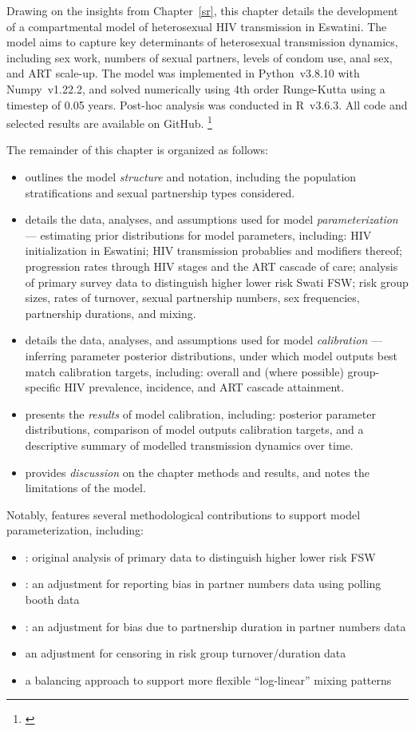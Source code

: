 Drawing on the insights from Chapter~\ref{sr},
this chapter details the development of
a compartmental model of heterosexual HIV transmission in Eswatini.
The model aims to capture key determinants of heterosexual transmission dynamics, including
sex work, numbers of sexual partners, levels of condom use, anal sex, and ART scale-up.
The model was implemented in Python~v3.8.10 with Numpy~v1.22.2,
and solved numerically using 4th order Runge-Kutta \cite{Gill1951} using a timestep of 0.05 years.
Post-hoc analysis was conducted in R~v3.6.3.
All code and selected results are available on GitHub.%
\footnote{\label{foot:github}}
\par
The remainder of this chapter is organized as follows:
\newcommand{\iref}[1]{\item \sref{#1}}
\begin{itemize}
  \iref{model.str} outlines the model \emph{structure} and notation, including
  the population stratifications and sexual partnership types considered.
  \iref{model.par} details the data, analyses, and assumptions used for model \emph{parameterization}
  --- \ie estimating prior distributions for model parameters, including:
  HIV initialization in Eswatini;
  HIV transmission probablies and modifiers thereof;
  progression rates through HIV stages and the ART cascade of care;
  analysis of primary survey data to distinguish higher \vs lower risk Swati FSW;
  risk group sizes, rates of turnover, sexual partnership numbers,
  sex frequencies, partnership durations, and mixing.
  \iref{model.cal} details the data, analyses, and assumptions used for model \emph{calibration}
  --- \ie inferring parameter posterior distributions,
  under which model outputs best match calibration targets, including:
  overall and (where possible) group-specific HIV prevalence, incidence, and ART cascade attainment.
  \iref{model.res} presents the \emph{results} of model calibration, including:
  posterior parameter distributions, comparison of model outputs \vs calibration targets, and
  a descriptive summary of modelled transmission dynamics over time.
  \iref{model.disc} provides \emph{discussion} on the chapter methods and results,
  and notes the limitations of the model.
\end{itemize}
\clearpage %
Notably,  features several methodological contributions
to support model parameterization, including:
\begin{itemize}
  \item{}:
  original analysis of primary data to distinguish higher \vs lower risk FSW
  \item{}:
  an adjustment for reporting bias in partner numbers data using polling booth data
  \item{}:
  an adjustment for bias due to partnership duration in partner numbers data
  \item{}
  an adjustment for censoring in risk group turnover/duration data
  \item{}
  a balancing approach to support more flexible ``log-linear'' mixing patterns \cite{Morris1991}
\end{itemize}

